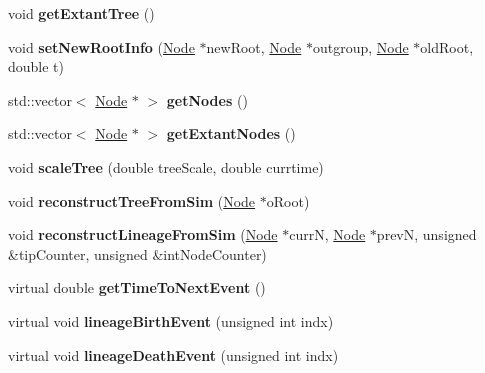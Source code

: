 \begin{DoxyCompactItemize}
void {\bfseries get\+Extant\+Tree} ()
\item 
\mbox{\label{class_tree_a9305a4ecd2cc070f27a8a86196afe059}} 
void {\bfseries set\+New\+Root\+Info} (\mbox{\hyperlink{class_node}{Node}} $\ast$new\+Root, \mbox{\hyperlink{class_node}{Node}} $\ast$outgroup, \mbox{\hyperlink{class_node}{Node}} $\ast$old\+Root, double t)
\item 
\mbox{\label{class_tree_a4d9bbfb9ba4ce389592a27e60bd13f73}} 
std\+::vector$<$ \mbox{\hyperlink{class_node}{Node}} $\ast$ $>$ {\bfseries get\+Nodes} ()
\item 
\mbox{\label{class_tree_add7e5124e4c1ea3e90527ee757870527}} 
std\+::vector$<$ \mbox{\hyperlink{class_node}{Node}} $\ast$ $>$ {\bfseries get\+Extant\+Nodes} ()
\item 
\mbox{\label{class_tree_a70850fb0eb058cbc09d7f04e415a73a6}} 
void {\bfseries scale\+Tree} (double tree\+Scale, double currtime)
\item 
\mbox{\label{class_tree_a0fecac6bee43cec92ff33ea7d72f272a}} 
void {\bfseries reconstruct\+Tree\+From\+Sim} (\mbox{\hyperlink{class_node}{Node}} $\ast$o\+Root)
\item 
\mbox{\label{class_tree_a363bc24cf9a55c692a1a46e84490759a}} 
void {\bfseries reconstruct\+Lineage\+From\+Sim} (\mbox{\hyperlink{class_node}{Node}} $\ast$currN, \mbox{\hyperlink{class_node}{Node}} $\ast$prevN, unsigned \&tip\+Counter, unsigned \&int\+Node\+Counter)
\item 
\mbox{\label{class_tree_a7c01dc7704c6260ffe45eaff909a32ed}} 
virtual double {\bfseries get\+Time\+To\+Next\+Event} ()
\item 
\mbox{\label{class_tree_a79f1029861423074c987d87047e157dc}} 
virtual void {\bfseries lineage\+Birth\+Event} (unsigned int indx)
\item 
\mbox{\label{class_tree_aa7c4d744180deb03c6d7baa49220b332}} 
virtual void {\bfseries lineage\+Death\+Event} (unsigned int indx)
\item 
\mbox{\label{class_tree_a1c35efd5f2d5a80f9358853be4e6390d}} 

\end{DoxyCompactItemize}
